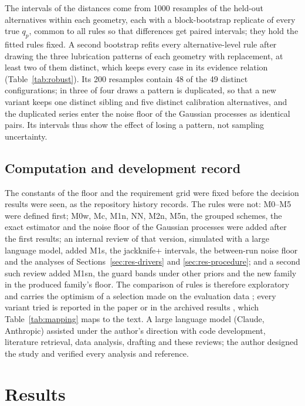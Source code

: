 \documentclass[pdflatex,sn-basic,lineno]{sn-jnl}
\begin{document}
The intervals of the distances come from 1000 resamples of the held-out alternatives within each geometry, each with a block-bootstrap replicate of every true $q_p$, common to all rules so that differences get paired intervals; they hold the fitted rules fixed. A second bootstrap refits every alternative-level rule after drawing the three lubrication patterns of each geometry with replacement, at least two of them distinct, which keeps every case in its evidence relation (Table~\ref{tab:robust}). Its 200 resamples contain 48 of the 49 distinct configurations; in three of four draws a pattern is duplicated, so that a new variant keeps one distinct sibling and five distinct calibration alternatives, and the duplicated series enter the noise floor of the Gaussian processes as identical pairs. Its intervals thus show the effect of losing a pattern, not sampling uncertainty.

\subsection{Computation and development record}\label{sec:computation}

The constants of the floor and the requirement grid were fixed before the decision results were seen, as the repository history records. The rules were not: M0--M5 were defined first; M0w, Mc, M1n, NN, M2n, M5n, the grouped schemes, the exact estimator and the noise floor of the Gaussian processes were added after the first results; an internal review of that version, simulated with a large language model, added M1s, the jackknife+ intervals, the between-run noise floor and the analyses of Sections~\ref{sec:res-drivers} and \ref{sec:res-procedure}; and a second such review added M1sn, the guard bands under other priors and the new family in the produced family's floor. The comparison of rules is therefore exploratory and carries the optimism of a selection made on the evaluation data \citep{cawley2010over}; every variant tried is reported in the paper or in the archived results \citep{canseven2026archive}, which Table~\ref{tab:mapping} maps to the text. A large language model (Claude, Anthropic) assisted under the author's direction with code development, literature retrieval, data analysis, drafting and these reviews; the author designed the study and verified every analysis and reference.

\section{Results}\label{sec:results}
\end{document}
